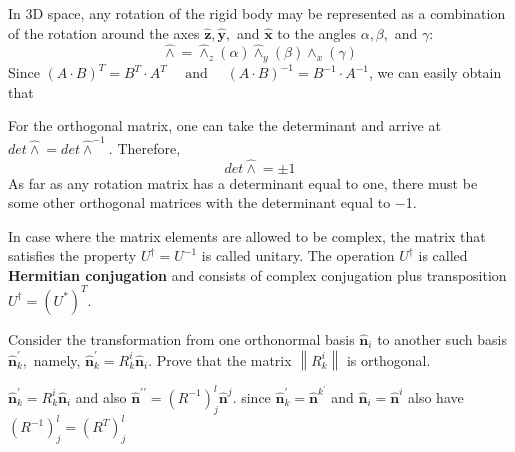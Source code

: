 In 3D space, any rotation of the rigid body may be represented as a combination of the rotation around the axes $\hat{\mathbf{z}}, \hat{\mathbf{y}},$ and $\hat{\mathbf{x}}$ to the angles $ \alpha, \beta,$ and $\gamma$:
$$
\hat{\wedge}=\hat{\wedge}_{z}(\alpha) \hat{\wedge}_{y}(\beta) \hat{\wedge}_{x}(\gamma)
$$
Since $(A \cdot B)^{T}=B^{T} \cdot A^{T} \quad \text { and } \quad(A \cdot B)^{-1}=B^{-1} \cdot A^{-1}$, we can easily obtain that 
\begin{qt}
For the orthogonal matrix, one can take the determinant and arrive at $det\hat{\wedge}=det\hat{\wedge}^{-1}$. Therefore, 
$$
det\hat{\wedge}=\pm1
$$
As far as any rotation matrix has a determinant equal to one, there must be some other orthogonal matrices with the determinant equal to −1.
\end{qt}
In case where the matrix elements are allowed to be complex, the matrix that satisfies the property $U^{\dagger}=U^{-1}$ is called unitary. The operation $U^{\dagger}$ is called \textbf{Hermitian conjugation} and consists of complex conjugation plus transposition $U^{\dagger}=\left(U^{*}\right)^{T}$.
\begin{example}
Consider the transformation from one orthonormal basis $\hat{\mathbf{n}}_{i}$ to another such basis $\hat{\mathbf{n}}_{k}^{\prime},$ namely, $\hat{\mathbf{n}}_{k}^{\prime}=R_{k}^{i} \hat{\mathbf{n}}_{i} .$ Prove that the matrix $\left\|R_{k}^{i}\right\|$ is orthogonal.

 $\hat{\mathbf{n}}_{k}^{\prime}=R_{k}^{i} \hat{\mathbf{n}}_{i}$ and also $\hat{\mathbf{n}}^{\prime \prime}=\left(R^{-1}\right)_{j}^{l} \hat{\mathbf{n}}^{j} .$ since $\hat{\mathbf{n}}_{k}^{\prime}=\hat{\mathbf{n}}^{k^{\prime}}$ and $\hat{\mathbf{n}}_{i}=\hat{\mathbf{n}}^{i}$
also have $\left(R^{-1}\right)_{j}^{l}=\left(R^{T}\right)_{j}^{l}$
\end{example}

